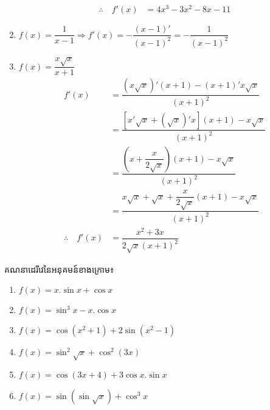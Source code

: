 \documentclass[a4paper,12pt]{article}
\begin{document}
\begin{enumerate}
\begin{align*}
		      \therefore \quad f'(x) & =4x^3-3x^2-8x-11
	      \end{align*}
	\item $f(x)=\dfrac{1}{x-1}\Longrightarrow f'(x)=-\dfrac{(x-1)'}{(x-1)^2}=-\dfrac{1}{(x-1)^2}$
	\item $f(x)=\dfrac{x\sqrt{x}}{x+1}$
	      \begin{align*}
		      f'(x)                  & =\dfrac{(x\sqrt{x})'(x+1)-(x+1)'x\sqrt{x}}{(x+1)^2}                      \\
		                             & =\dfrac{[x'\sqrt{x}+(\sqrt{x})'x ](x+1)-x\sqrt{x}}{(x+1)^2}              \\
		                             & =\dfrac{\left(x+\dfrac{x}{2\sqrt{x}}\right)(x+1)-x\sqrt{x}}{(x+1)^2}     \\
		                             & =\dfrac{x\sqrt{x}+\sqrt{x}+\dfrac{x}{2\sqrt{x}}(x+1)-x\sqrt{x}}{(x+1)^2} \\
		      \therefore \quad f'(x) & = \dfrac{x^2+3x}{2\sqrt{x}(x+1)^2}
	      \end{align*}



\end{enumerate}

\begin{exercise}
	គណនាដេរីវេនៃអនុគមន៍ខាងក្រោម៖
	\begin{multicols}{2}
		\begin{enumerate}
			\item $f(x)=x.\sin x+\cos x$
			\item $f(x)=\sin^3 x-x.\cos x$
			\item $f(x)=\cos (x^2+1)+2\sin (x^2-1)$
			\item $f(x)=\sin^2\sqrt{x}+\cos^2 (3x)$
			\item $f(x)=\cos (3x+4)+3\cos x.\sin x$
			\item $f(x)=\sin (\sin \sqrt{x})+\cos^3 x$
		\end{enumerate}
	\end{multicols}
\end{exercise}
\end{document}
